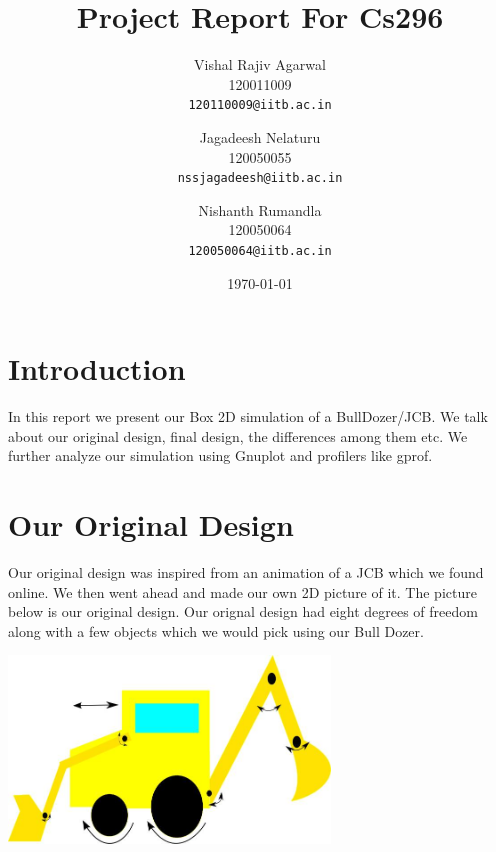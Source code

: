 \documentclass[11pt]{article}
\begin{document}
\title{Project Report For Cs296}

\author{
	Vishal Rajiv Agarwal\\
	120011009\\
	\texttt{120110009@iitb.ac.in}
	\and
	Jagadeesh Nelaturu\\
	120050055\\
	\texttt{nssjagadeesh@iitb.ac.in}
	\and
	Nishanth Rumandla\\
	120050064\\
	\texttt{120050064@iitb.ac.in}}

\date{\today}

\maketitle

\section{Introduction}
	In this report we present our Box 2D simulation of a BullDozer/JCB. We talk about our original design, final design, the differences among them etc. We further analyze our simulation using Gnuplot and profilers like gprof.  
\section{Our Original Design}
	Our original design was inspired from an animation of a JCB which we found online. We then went ahead and made our own 2D picture of it. The picture below is our original design. Our orignal design had eight degrees of freedom along with a few objects which we would pick using our Bull Dozer. 
	\begin{center}\includegraphics[height=5cm]{BullDozerDesign.jpg}\end{center}
\end{document}

